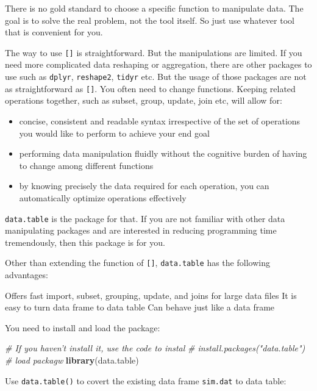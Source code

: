 \documentclass[12pt,]{krantz}
\makeatletter
\newenvironment{Shaded}{\begin{snugshade}}{\end{snugshade}}
\newcommand{\KeywordTok}[1]{\textcolor[rgb]{0.27,0.27,0.27}{\textbf{#1}}}
\newcommand{\CommentTok}[1]{\textcolor[rgb]{0.37,0.37,0.37}{\textit{#1}}}
\newcommand{\NormalTok}[1]{#1}
\providecommand{\tightlist}{%
  \setlength{\itemsep}{0pt}\setlength{\parskip}{0pt}}
\newenvironment{kframe}{%
\medskip{}
\setlength{\fboxsep}{.8em}
 \def\at@end@of@kframe{}%
 \ifinner\ifhmode%
  \def\at@end@of@kframe{\end{minipage}}%
  \begin{minipage}{\columnwidth}%
 \fi\fi%
 \def\FrameCommand##1{\hskip\@totalleftmargin \hskip-\fboxsep
 \colorbox{shadecolor}{##1}\hskip-\fboxsep
     \hskip-\linewidth \hskip-\@totalleftmargin \hskip\columnwidth}%
 \MakeFramed {\advance\hsize-\width
   \@totalleftmargin\z@ \linewidth\hsize
   \@setminipage}}%
 {\par\unskip\endMakeFramed%
 \at@end@of@kframe}
\renewenvironment{Shaded}{\begin{kframe}}{\end{kframe}}
\theoremstyle{definition}
\theoremstyle{definition}
\theoremstyle{definition}
\theoremstyle{remark}
\makeatother
\begin{document}
There is no gold standard to choose a specific function to manipulate
data. The goal is to solve the real problem, not the tool itself. So
just use whatever tool that is convenient for you.

The way to use \texttt{{[}{]}} is straightforward. But the manipulations
are limited. If you need more complicated data reshaping or aggregation,
there are other packages to use such as \texttt{dplyr},
\texttt{reshape2}, \texttt{tidyr} etc. But the usage of those packages
are not as straightforward as \texttt{{[}{]}}. You often need to change
functions. Keeping related operations together, such as subset, group,
update, join etc, will allow for:

\begin{itemize}
\tightlist
\item
  concise, consistent and readable syntax irrespective of the set of
  operations you would like to perform to achieve your end goal
\item
  performing data manipulation fluidly without the cognitive burden of
  having to change among different functions
\item
  by knowing precisely the data required for each operation, you can
  automatically optimize operations effectively
\end{itemize}

\texttt{data.table} is the package for that. If you are not familiar
with other data manipulating packages and are interested in reducing
programming time tremendously, then this package is for you.

Other than extending the function of \texttt{{[}{]}},
\texttt{data.table} has the following advantages:

Offers fast import, subset, grouping, update, and joins for large data
files It is easy to turn data frame to data table Can behave just like a
data frame

You need to install and load the package:

\begin{Shaded}
\begin{Highlighting}[]
\CommentTok{# If you haven't install it, use the code to instal}
\CommentTok{# install.packages("data.table")}
\CommentTok{# load packagw}
\KeywordTok{library}\NormalTok{(data.table)}
\end{Highlighting}
\end{Shaded}

Use \texttt{data.table()} to covert the existing data frame
\texttt{sim.dat} to data table:
\end{document}
